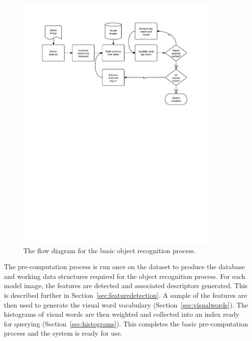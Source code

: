 \documentclass[11pt, onecolumn, a4paper, final]{report} %
\begin{document}
\begin{figure}[htb]
\centering 
\includegraphics[width=0.9\textwidth]{images/SearchProcess.pdf}
\caption{The flow diagram for the basic object recognition process.}
\label{fig:searchprocess}
\end{figure}

The pre-computation process is run once on the dataset to produce the database and working data structures required for the object recognition process. For each model image, the features are detected and associated descriptors generated. This is described further in Section~\ref{sec:featuredetection}. A sample of the features are then used to generate the visual word vocabulary (Section~\ref{sec:visualwords}). The histograms of visual words are then weighted and collected into an index ready for querying (Section~\ref{sec:histograms}). This completes the basic pre-computation process and the system is ready for use.
\end{document}
